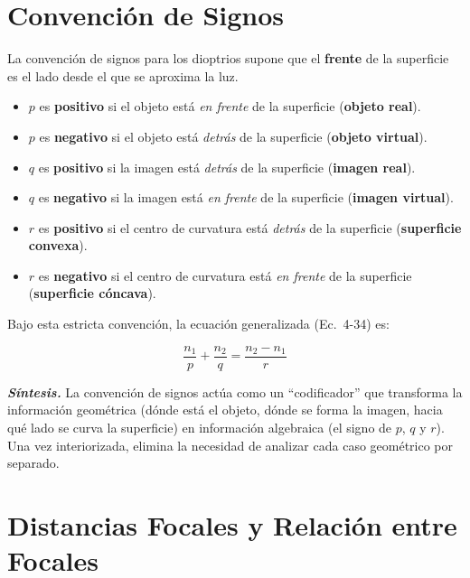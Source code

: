 \documentclass[12pt, a4paper]{article}
\theoremstyle{definition}
\begin{document}
\section{Convención de Signos}

La convención de signos para los dioptrios supone que el \textbf{frente} de la superficie
es el lado desde el que se aproxima la luz.

\begin{itemize}
  \item \(p\) es \textbf{positivo} si el objeto está \textit{en frente} de la superficie
        (\textbf{objeto real}).
  \item \(p\) es \textbf{negativo} si el objeto está \textit{detrás} de la superficie
        (\textbf{objeto virtual}).
  \item \(q\) es \textbf{positivo} si la imagen está \textit{detrás} de la superficie
        (\textbf{imagen real}).
  \item \(q\) es \textbf{negativo} si la imagen está \textit{en frente} de la superficie
        (\textbf{imagen virtual}).
  \item \(r\) es \textbf{positivo} si el centro de curvatura está \textit{detrás} de la
        superficie (\textbf{superficie convexa}).
  \item \(r\) es \textbf{negativo} si el centro de curvatura está \textit{en frente} de la
        superficie (\textbf{superficie cóncava}).
\end{itemize}

Bajo esta estricta convención, la ecuación generalizada (Ec.\ 4-34) es:

\begin{equation}
  \frac{n_1}{p} + \frac{n_2}{q} = \frac{n_2 - n_1}{r}
  \label{eq:fundamental_general}
\end{equation}

\textit{\textbf{Síntesis.}} La convención de signos actúa como un ``codificador'' que
transforma la información geométrica (dónde está el objeto, dónde se forma la imagen, hacia
qué lado se curva la superficie) en información algebraica (el signo de \(p\), \(q\) y
\(r\)). Una vez interiorizada, elimina la necesidad de analizar cada caso geométrico por
separado.

\section{Distancias Focales y Relación entre Focales}
\end{document}
